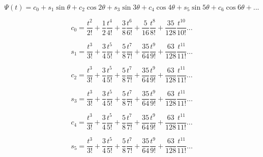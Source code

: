 \documentclass{article}
\begin{document}
\begin{equation}
   \Psi(t) = c_0 + s_1 \sin \theta + c_2 \cos 2\theta + s_3 \sin 3\theta + c_4 \cos 4\theta + s_5 \sin 5\theta + c_6 \cos 6\theta + ...
\end{equation}

\begin{equation}
   c_0 = \frac{t^2}{2!} + \frac{1}{2}\frac{t^4}{4!} + \frac{3}{8} \frac{t^6}{6!} + \frac{5}{16} \frac{t^8}{8!} + \frac{35}{128} \frac{t^{10}}{10!}  ...
\end{equation}

\begin{equation}
   s_1 = \frac{t^3}{3!} + \frac{3}{4}\frac{t^5}{5!} + \frac{5}{8} \frac{t^7}{7!} + \frac{35}{64} \frac{t^9}{9!} + \frac{63}{128} \frac{t^{11}}{11!}  ...
\end{equation}

\begin{equation}
   c_2 = \frac{t^3}{3!} + \frac{3}{4}\frac{t^5}{5!} + \frac{5}{8} \frac{t^7}{7!} + \frac{35}{64} \frac{t^9}{9!} + \frac{63}{128} \frac{t^{11}}{11!}  ...
\end{equation}

\begin{equation}
   s_3 = \frac{t^3}{3!} + \frac{3}{4}\frac{t^5}{5!} + \frac{5}{8} \frac{t^7}{7!} + \frac{35}{64} \frac{t^9}{9!} + \frac{63}{128} \frac{t^{11}}{11!}  ...
\end{equation}

\begin{equation}
   c_4 = \frac{t^3}{3!} + \frac{3}{4}\frac{t^5}{5!} + \frac{5}{8} \frac{t^7}{7!} + \frac{35}{64} \frac{t^9}{9!} + \frac{63}{128} \frac{t^{11}}{11!}  ...
\end{equation}

\begin{equation}
   s_5 = \frac{t^3}{3!} + \frac{3}{4}\frac{t^5}{5!} + \frac{5}{8} \frac{t^7}{7!} + \frac{35}{64} \frac{t^9}{9!} + \frac{63}{128} \frac{t^{11}}{11!}  ...
\end{equation}
\end{document}
